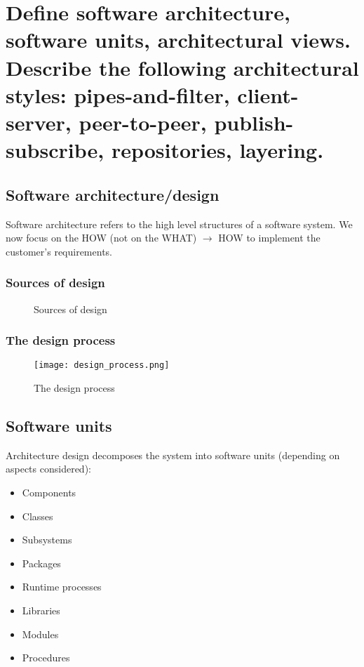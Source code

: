 \clearpage{}
\section{Define software architecture, software units, architectural views.
Describe the following architectural styles: pipes-and-filter,
client-server, peer-to-peer, publish-subscribe, repositories, layering.}

\subsection{Software architecture/design}

Software architecture refers to the high level structures of a software system.
We now focus on the HOW (not on the WHAT) $\rightarrow$ HOW to implement the
customer's requirements.

\subsubsection{Sources of design}

\begin{figure}[!ht]
    \centering
    
    \caption{Sources of design}
\end{figure}

\subsubsection{The design process}

\begin{figure}[!ht]
    \centering
    \texttt{[image: design\_process.png]}
    \caption{The design process}
\end{figure}

\subsection{Software units}

Architecture design decomposes the system into software units (depending on
aspects considered):

\begin{itemize}
    \item Components
    \item Classes
    \item Subsystems
    \item Packages
    \item Runtime processes
    \item Libraries
    \item Modules
    \item Procedures
\end{itemize}

